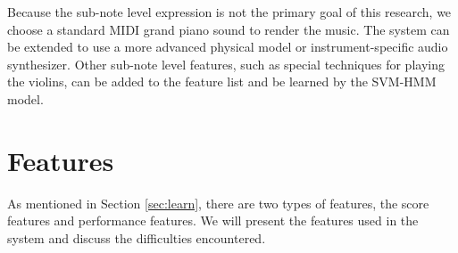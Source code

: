Because the sub-note level expression is not the primary goal of this research, we choose a standard MIDI grand piano sound to render the music. The system can be extended to use a more advanced physical model or instrument-specific audio synthesizer. Other sub-note level features, such as special techniques for playing the violins, can be added to the feature list and be learned by the SVM-HMM model.
   
\section{Features}\label{sec:features}

   As mentioned in Section \ref{sec:learn}, there are two types of features, the score features and performance features. We will present the features used in the system and discuss the difficulties encountered.
